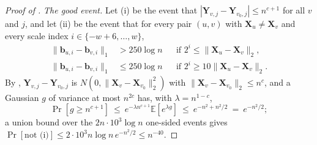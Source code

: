 \documentclass[11pt]{article}
\theoremstyle{remark}
\newcommand{\XX}{\mathbf X}
\newcommand{\YY}{\mathbf{Y}}
\newcommand{\Ex}{\mathbb E}
\newcommand{\norm}[1]{\lVert#1\rVert}
\newcommand{\bb}{\mathbf b}
\begin{document}
\begin{proof}[Proof of ]
\emph{The good event.}
Let (i) be the event that
$|\YY_{v,j}-\YY_{v_0,j}|\le n^{c+1}$ for all $v$ and $j$, and let (ii) be
the event that for every pair $(u,v)$ with $\XX_u\neq\XX_v$ and every scale
index $i\in\{-w+6,\dots,w\}$,
\begin{align*}
\norm{\bb_{u,i}-\bb_{v,i}}_1&>250\log n
&&\text{if }2^{i}\le\norm{\XX_u-\XX_v}_2,\\
\norm{\bb_{u,i}-\bb_{v,i}}_1&\le250\log n
&&\text{if }2^{i}\ge10\norm{\XX_u-\XX_v}_2 .
\end{align*}
By , $\YY_{v,j}-\YY_{v_0,j}$ is
$N(0,\norm{\XX_v-\XX_{v_0}}_2^{2})$
with $\norm{\XX_v-\XX_{v_0}}_2\le n^{c}$, and a Gaussian $g$ of variance at
most $n^{2c}$ has, with $\lambda=n^{1-c}$,
\[
\Pr[g\ge n^{c+1}]\ \le\ e^{-\lambda n^{c+1}}\Ex[e^{\lambda g}]
\ \le\ e^{-n^{2}+n^{2}/2}\ =\ e^{-n^{2}/2};
\]
a union bound over the $2n\cdot10^{3}\log n$ one-sided events gives
$\Pr[\text{not (i)}]\le2\cdot10^{3}n\log n\,e^{-n^{2}/2}\le n^{-40}$.


\end{proof}
\end{document}
